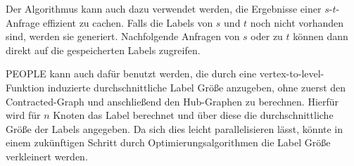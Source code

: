 Der Algorithmus kann auch dazu verwendet werden, die Ergebnisse einer $s$-$t$-Anfrage effizient zu cachen.
Falls die Labels von $s$ und $t$ noch nicht vorhanden sind, werden sie generiert.
Nachfolgende Anfragen von $s$ oder zu $t$ können dann direkt auf die gespeicherten Labels zugreifen.

PEOPLE kann auch dafür benutzt werden, die durch eine vertex-to-level-Funktion induzierte durchschnittliche Label Größe anzugeben, ohne zuerst den Contracted-Graph und anschließend den Hub-Graphen zu berechnen.
Hierfür wird für $n$ Knoten das Label berechnet und über diese die durchschnittliche Größe der Labels angegeben.
Da sich dies leicht parallelisieren lässt, könnte in einem zukünftigen Schritt durch Optimierungsalgorithmen die Label Größe verkleinert werden.